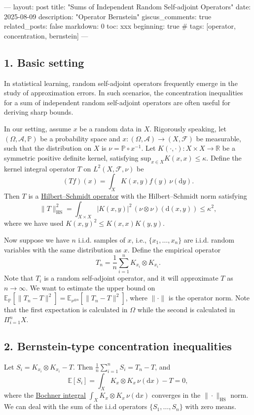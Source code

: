 ---
layout: post
title: "Sums of Independent Random Self-adjoint Operators"
date: 2025-08-09
description: "Operator Bernstein"
giscus_comments: true
related_posts: false
markdown: 0
toc: xxx
beginning: true
# tags: [operator, concentration, bernstein]
---

\subsection*{1. Basic setting}
In statistical learning, random self-adjoint operators frequently emerge in the study of approximation errors. In such scenarios, the concentration inequalities for a sum of independent random self-adjoint operators are often useful for deriving sharp bounds.

In our setting, assume $x$ be a random data in $X$. Rigorously speaking, let $(\Omega,\mathcal{A},\mathbb{P})$ be a probability space and $x: (\Omega,\mathcal{A})\rightarrow (X,\mathcal{F})$ be measurable, such that the distribution on $X$ is $\nu=\mathbb{P}\circ x^{-1}$. Let $K(\cdot,\cdot): X \times X \rightarrow \mathbb{R}$
be a symmetric positive definite kernel, satisfying $\mathrm{sup}_{x\in X} K(x,x) \leq \kappa$. Define the kernel integral operator $T$ on $L^{2}(X,\mathcal{F},\nu)$ be
\begin{equation}
  (Tf)(x) = \int_{X}K(x,y)f(y)\,\nu(\mathrm{d}y). 
\end{equation}
Then $T$ is a \href{https://en.wikipedia.org/wiki/Hilbert%E2%80%93Schmidt_operator}{Hilbert--Schmidt operator} with the Hilbert--Schmidt norm satisfying
\[ \|T\|_{\mathrm{HS}}^{2}
= \int_{X\times X} |K(x,y)|^2 \, (\nu\otimes\nu)(\mathrm{d}(x,y))
\leq \kappa^2 ,\]
where we have used $K(x,y)^2\leq K(x,x)K(y,y)$. 

Now suppose we have $n$ i.i.d. samples of $x$, i.e., $\{x_1,\dots,x_n\}$ are i.i.d. random variables with the same distribution as $x$. Define the empirical operator
\begin{equation}
  T_n = \frac{1}{n}\sum_{i=1}^{n} K_{x_i}\otimes K_{x_i} .
\end{equation}
Note that $T_i$ is a random self-adjoint operator, and it will approximate $T$ as $n\to \infty$. 
We want to estimate the upper bound on $\mathbb{E}_{\mathbb{P}}[\|T_n-T\|^2]=\mathbb{E}_{\nu^{\otimes n}}[\|T_n-T\|^2]$, where $\|\cdot\|$ is the operator norm. Note that the first expectation is calculated in $\Omega$ while the second is calculated in $\Pi_{i=1}^{n}X$.

\subsection*{2. Bernstein-type concentration inequalities}
Let $S_i=K_{x_i}\otimes K_{x_i}-T$. Then $\frac{1}{n}\sum_{i=1}^{n}S_i=T_n-T$, and
\[
\mathbb{E}[S_i] = \int_{X}K_{x}\otimes K_{x}\,\nu(\mathrm{d}x) - T = 0,
\]
where the \href{https://en.wikipedia.org/wiki/Bochner_integral}{Bochner integral} $\int_{X}K_{x}\otimes K_{x}\,\nu(\mathrm{d}x)$ converges in the $\|\cdot\|_{\mathrm{HS}}$ norm. We can deal with the sum of the i.i.d operators $\{S_1,\dots,S_n\}$ with zero means. 

